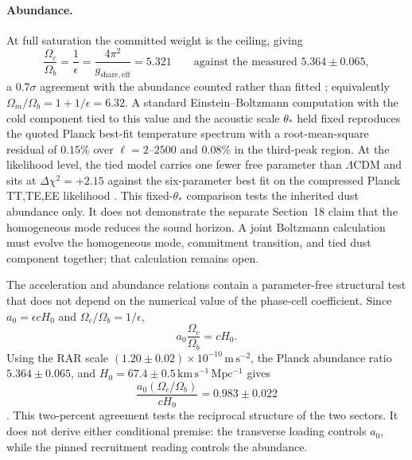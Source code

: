 \documentclass[11pt]{article}
\begin{document}
\paragraph{Abundance.}
At full saturation the committed weight is the ceiling, giving
\[
\frac{\Omega_c}{\Omega_b}=\frac{1}{\epsilon}=\frac{4\pi^2}{g_{\mathrm{share,eff}}}=5.321
\qquad\text{against the measured } 5.364\pm0.065,
\]
a $0.7\sigma$ agreement with the abundance counted rather than fitted \citep{Planck2020}; equivalently $\Omega_m/\Omega_b=1+1/\epsilon=6.32$. A standard Einstein--Boltzmann computation \citep{Lewis2000} with the cold component tied to this value and the acoustic scale $\theta_*$ held fixed reproduces the quoted Planck best-fit temperature spectrum with a root-mean-square residual of $0.15\%$ over $\ell=2$--$2500$ and $0.08\%$ in the third-peak region. At the likelihood level, the tied model carries one fewer free parameter than $\Lambda$CDM and sits at $\Delta\chi^2=+2.15$ against the six-parameter best fit on the compressed Planck TT,TE,EE likelihood \citep{PrinceDunkley2019}. This fixed-$\theta_*$ comparison tests the inherited dust abundance only. It does not demonstrate the separate Section~18 claim that the homogeneous mode reduces the sound horizon. A joint Boltzmann calculation must evolve the homogeneous mode, commitment transition, and tied dust component together; that calculation remains open.

The acceleration and abundance relations contain a parameter-free structural test that does not depend on the numerical value of the phase-cell coefficient. Since $a_0=\epsilon cH_0$ and $\Omega_c/\Omega_b=1/\epsilon$,
\[
\boxed{
a_0\frac{\Omega_c}{\Omega_b}=cH_0
}.
\]
Using the RAR scale $(1.20\pm0.02)\times10^{-10}\,\mathrm{m\,s^{-2}}$, the Planck abundance ratio $5.364\pm0.065$, and $H_0=67.4\pm0.5\,\mathrm{km\,s^{-1}\,Mpc^{-1}}$ gives
\[
\frac{a_0(\Omega_c/\Omega_b)}{cH_0}=0.983\pm0.022
\]
\citep{McGaugh2016,Planck2020}. This two-percent agreement tests the reciprocal structure of the two sectors. It does not derive either conditional premise: the transverse loading controls $a_0$, while the pinned recruitment reading controls the abundance.
\end{document}
